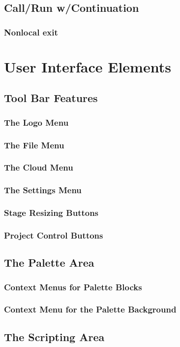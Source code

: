 \documentclass{report}
\begin{document}
\section{Call/Run w/Continuation}
\subsection{Nonlocal exit}
\chapter{User Interface Elements}
\section{Tool Bar Features}
\subsection{The \Snap{} Logo Menu}
\subsection{The File Menu}
\subsection{The Cloud Menu}
\subsection{The Settings Menu}
\subsection{Stage Resizing Buttons}
\subsection{Project Control Buttons}
\section{The Palette Area}
\subsection{Context Menus for Palette Blocks}
\subsection{Context Menu for the Palette Background}
\section{The Scripting Area}
\end{document}
